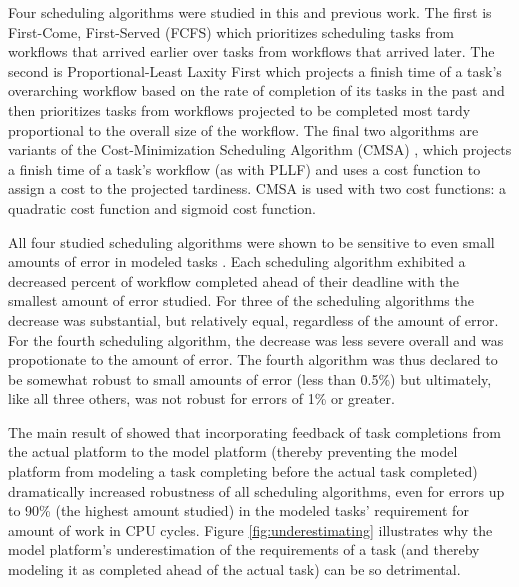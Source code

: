\documentclass[10pt]{csce}
\begin{document}
Four scheduling algorithms were studied in this and previous work. The first
is First-Come, First-Served (FCFS) which prioritizes scheduling tasks from
workflows that arrived earlier over tasks from workflows that arrived later.
The second is Proportional-Least Laxity First which projects a finish time
of a task's overarching workflow based on the rate of completion of its tasks
in the past and then prioritizes tasks from workflows projected to be
completed most tardy proportional to the overall size of the workflow. The
final two algorithms are variants of the Cost-Minimization Scheduling Algorithm
(CMSA) \cite{costmin}, which projects a finish time of a task's workflow (as
with PLLF) and uses a cost function to assign a cost to the projected
tardiness. CMSA is used with two cost functions: a quadratic cost function and
sigmoid cost function.

All four studied scheduling algorithms were shown to be sensitive to
even small amounts of error in modeled tasks \cite{pdpta18}.  Each scheduling
algorithm exhibited a decreased percent of workflow completed ahead of their
deadline with the smallest amount of error studied.  For three of the
scheduling algorithms the decrease was substantial, but relatively equal,
regardless of the amount of error.  For the fourth scheduling algorithm, the
decrease was less severe overall and was propotionate to the amount of error.
The fourth algorithm was thus declared to be somewhat robust to small amounts
of error (less than 0.5\%) but ultimately, like all three others, was not
robust for errors of 1\% or greater.

The main result of \cite{pdpta18} showed that incorporating feedback of
task completions from the actual platform to the model platform (thereby
preventing the model platform from modeling a task completing before the
actual task completed) dramatically increased robustness of all scheduling
algorithms, even for errors up to 90\% (the highest amount studied) in the
modeled tasks' requirement for amount of work in CPU cycles.  Figure
\ref{fig:underestimating} illustrates why the model platform's underestimation
of the requirements of a task (and thereby modeling it as completed ahead of
the actual task) can be so detrimental.
\end{document}
